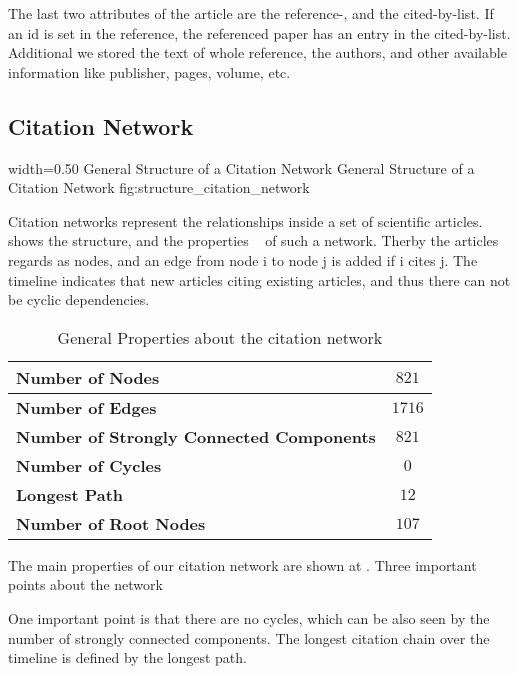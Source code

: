 The last two attributes of the article are the reference-, and the cited-by-list. If an id is set in the reference, the referenced paper has an entry in the cited-by-list. Additional we stored the text of whole reference, the authors, and other available information like publisher, pages, volume, etc.

\subsection{Citation Network}
\label{sec:citation_network}

      {width=0.50\textwidth}
      {General Structure of a Citation Network}
      {General Structure of a Citation Network}
      {fig:structure_citation_network}

Citation networks represent the relationships inside a set of scientific articles.  shows the structure, and the properties ~\cite{kas2011} of such a network. Therby the articles regards as nodes, and an edge from node i to node j is added if i cites j. The timeline indicates that new articles citing existing articles, and thus there can not be cyclic dependencies.

\begin{table}
  \centering
  \begin{tabular}{ l c }
    \toprule
    \textbf{Number of Nodes}      & $821$  \\ \midrule
    \textbf{Number of Edges}      & $1716$ \\ \midrule
    \textbf{Number of Strongly Connected Components} & $821$    \\ \midrule
    \textbf{Number of Cycles}     & $0$    \\ \midrule
    \textbf{Longest Path}         & $12$   \\ \midrule
    \textbf{Number of Root Nodes} & $107$  \\
    \bottomrule
  \end{tabular}
  \caption[General Properties about the citation network in the used dataset]{General Properties about the citation network}
  \label{tbl:general_properties_about_the_graph}
\end{table}

The main properties of our citation network are shown at . Three important points about the network


One important point is that there are no cycles, which can be also seen by the number of strongly connected components. The longest citation chain over the timeline is defined by the longest path.

